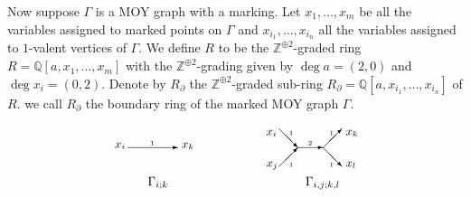 \documentclass{amsart}
\theoremstyle{plain}
\theoremstyle{definition}
\theoremstyle{remark}
\numberwithin{equation}{section}
\begin{document}
Now suppose $\Gamma$ is a MOY graph with a marking. Let $x_1,\dots, x_m$ be all the variables assigned to marked points on $\Gamma$ and $x_{i_1},\dots,x_{i_n}$ all the variables assigned to $1$-valent vertices of $\Gamma$. We define $R$ to be the ${\mathbb{Z}}^{\oplus 2}$-graded ring $R={\mathbb{Q}}[a,x_1,\dots,x_m]$ with the ${\mathbb{Z}}^{\oplus 2}$-grading given by $\deg a = (2,0)$ and $\deg x_i = (0,2)$. Denote by $R_\partial$ the ${\mathbb{Z}}^{\oplus 2}$-graded sub-ring $R_\partial={\mathbb{Q}}[a,x_{i_1},\dots,x_{i_n}]$ of $R$. we call $R_\partial$ the boundary ring of the marked MOY graph $\Gamma$.

\begin{figure}[ht]

\[
\xymatrix{

\setlength{\unitlength}{1pt}
\begin{picture}(60,45)(-30,-15)

\put(-20,15){\vector(1,0){40}}

\put(-2,17){\tiny{$1$}}

\put(-30,15){\small{$x_i$}}

\put(23,15){\small{$x_k$}}

\put(-4,-15){$\Gamma_{i;k}$}

\end{picture}
 && 
\setlength{\unitlength}{1pt}
\begin{picture}(70,45)(-35,-15)

\put(-10,15){\vector(1,0){20}}

\put(-25,0){\vector(1,1){15}}

\put(-25,30){\vector(1,-1){15}}

\put(10,15){\vector(1,-1){15}}

\put(10,15){\vector(1,1){15}}

\put(-2,17){\tiny{$2$}}

\put(-17,0){\tiny{$1$}}

\put(-17,25){\tiny{$1$}}

\put(15,0){\tiny{$1$}}

\put(15,25){\tiny{$1$}}

\put(-35,0){\small{$x_j$}}

\put(-35,25){\small{$x_i$}}

\put(28,0){\small{$x_l$}}

\put(28,25){\small{$x_k$}}

\put(-4,-15){$\Gamma_{i,j;k,l}$}

\end{picture}

}
\]

\caption{}\label{fig-MOY-pieces}

\end{figure}
\end{document}
